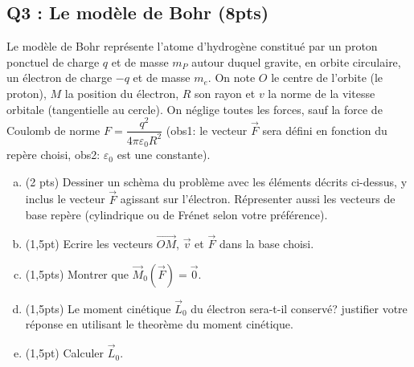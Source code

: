\documentclass[french,10pt,twocolumn]{article}
\begin{document}
	\subsection*{Q3 : Le modèle de Bohr (8pts)}	
	Le modèle de Bohr représente l’atome d’hydrogène constitué par un proton ponctuel de charge $q$ et de masse $m_P$ autour duquel gravite, en orbite circulaire, un électron de charge $-q$ et de masse $m_e$. On note $O$ le centre de l’orbite (le proton), $M$ la position du électron, $R$ son rayon et $v$ la norme de la vitesse orbitale (tangentielle au cercle). On néglige toutes les forces, sauf la force de Coulomb de norme $F =  \dfrac{q^2}{4\pi\varepsilon_0 R^2}$ (obs1: le vecteur $\vec{F}$ sera défini en fonction du repère choisi, obs2: $\varepsilon_0$ est une constante).
	\begin{enumerate}[a)]
	\item (2 pts) Dessiner un schèma du problème avec les éléments décrits ci-dessus, y inclus le vecteur $\vec{F}$ agissant sur l'électron. Répresenter aussi les vecteurs de base repère (cylindrique ou de Frénet selon votre préférence).
	\item (1,5pt) Ecrire les vecteurs $\vec{OM}$, $\vec{v}$ et $\vec{F}$ dans la base choisi.
	\item (1,5pts) Montrer que $\vec{M}_0(\vec{F}) = \vec{0}$.
	\item (1,5pts) Le moment cinétique $\vec{L}_0$ du électron sera-t-il conservé?  justifier votre réponse en utilisant le theorème du moment cinétique.
	\item (1,5pt) Calculer $\vec{L}_0$.
	\end{enumerate}
\end{document}
